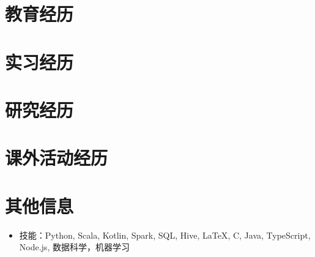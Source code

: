 \documentclass{resumeZH}
\begin{document}
\section{教育经历}

\pennmaster
\thuundergrad

\section{实习经历}

\msra
\bytedance

\section{研究经历}

\ryanresearch

\section{课外活动经历}

\eydatascience
\cnkibibtex

\section{其他信息}

\vspace{0.618ex}
\begin{itemize}
\item 技能：Python, Scala, Kotlin, Spark, SQL, Hive, {\LaTeX}, C, Java, TypeScript, Node.js, 数据科学，机器学习
\end{itemize}
\end{document}
